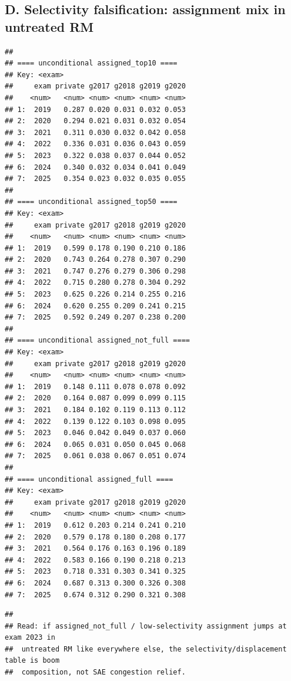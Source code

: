 \documentclass[
]{article}
\begin{document}
\hypertarget{d.-selectivity-falsification-assignment-mix-in-untreated-rm}{%
\subsection{D. Selectivity falsification: assignment mix in untreated
RM}\label{d.-selectivity-falsification-assignment-mix-in-untreated-rm}}

\begin{verbatim}
## 
## ==== unconditional assigned_top10 ====
## Key: <exam>
##     exam private g2017 g2018 g2019 g2020
##    <num>   <num> <num> <num> <num> <num>
## 1:  2019   0.287 0.020 0.031 0.032 0.053
## 2:  2020   0.294 0.021 0.031 0.032 0.054
## 3:  2021   0.311 0.030 0.032 0.042 0.058
## 4:  2022   0.336 0.031 0.036 0.043 0.059
## 5:  2023   0.322 0.038 0.037 0.044 0.052
## 6:  2024   0.340 0.032 0.034 0.041 0.049
## 7:  2025   0.354 0.023 0.032 0.035 0.055
## 
## ==== unconditional assigned_top50 ====
## Key: <exam>
##     exam private g2017 g2018 g2019 g2020
##    <num>   <num> <num> <num> <num> <num>
## 1:  2019   0.599 0.178 0.190 0.210 0.186
## 2:  2020   0.743 0.264 0.278 0.307 0.290
## 3:  2021   0.747 0.276 0.279 0.306 0.298
## 4:  2022   0.715 0.280 0.278 0.304 0.292
## 5:  2023   0.625 0.226 0.214 0.255 0.216
## 6:  2024   0.620 0.255 0.209 0.241 0.215
## 7:  2025   0.592 0.249 0.207 0.238 0.200
## 
## ==== unconditional assigned_not_full ====
## Key: <exam>
##     exam private g2017 g2018 g2019 g2020
##    <num>   <num> <num> <num> <num> <num>
## 1:  2019   0.148 0.111 0.078 0.078 0.092
## 2:  2020   0.164 0.087 0.099 0.099 0.115
## 3:  2021   0.184 0.102 0.119 0.113 0.112
## 4:  2022   0.139 0.122 0.103 0.098 0.095
## 5:  2023   0.046 0.042 0.049 0.037 0.060
## 6:  2024   0.065 0.031 0.050 0.045 0.068
## 7:  2025   0.061 0.038 0.067 0.051 0.074
## 
## ==== unconditional assigned_full ====
## Key: <exam>
##     exam private g2017 g2018 g2019 g2020
##    <num>   <num> <num> <num> <num> <num>
## 1:  2019   0.612 0.203 0.214 0.241 0.210
## 2:  2020   0.579 0.178 0.180 0.208 0.177
## 3:  2021   0.564 0.176 0.163 0.196 0.189
## 4:  2022   0.583 0.166 0.190 0.218 0.213
## 5:  2023   0.718 0.331 0.303 0.341 0.325
## 6:  2024   0.687 0.313 0.300 0.326 0.308
## 7:  2025   0.674 0.312 0.290 0.321 0.308
\end{verbatim}

\begin{verbatim}
## 
## Read: if assigned_not_full / low-selectivity assignment jumps at exam 2023 in
##  untreated RM like everywhere else, the selectivity/displacement table is boom
##  composition, not SAE congestion relief.
\end{verbatim}
\end{document}
